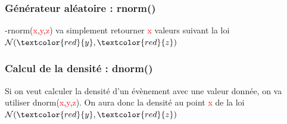 \documentclass{article}
\newcommand{\argument}[1]{\textcolor{red}{#1}}
\begin{document}
\subsubsection{Générateur aléatoire : rnorm()}
-rnorm(\argument{x},\argument{y},\argument{z}) va simplement retourner \argument{x} valeurs suivant la loi $\mathcal{N}(\argument{y}, \argument{z})$

\subsubsection{Calcul de la densité : dnorm()}
Si on veut calculer la densité d'un évènement avec une valeur donnée, on va utiliser dnorm(\argument{x},\argument{y},\argument{z}). On aura donc la densité au point \argument{x} de la loi $\mathcal{N}(\argument{y}, \argument{z})$
\end{document}
